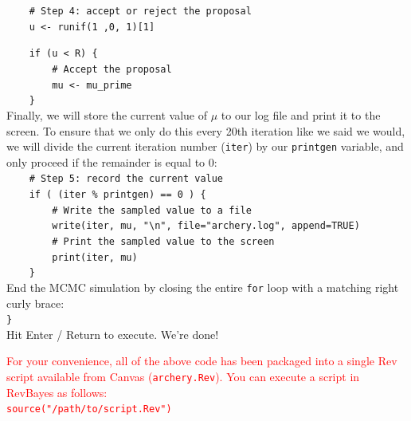 \documentclass[12pt]{article}
\begin{document}
\indent \texttt{\ \ \ \ \# Step 4: accept or reject the proposal} \\
\indent \texttt{\ \ \ \ u <- runif(1 ,0, 1)[1] } \\

\newpage

\indent \texttt{\ \ \ \ if (u < R) \{} \\
\indent \texttt{\ \ \ \ \ \ \ \ \# Accept the proposal} \\
\indent \texttt{\ \ \ \ \ \ \ \ mu <- mu\_prime} \\ 
\indent \texttt{\ \ \ \ \}} \\

\noindent Finally, we will store the current value of $\mu$ to our log file and print it to the screen. To ensure that we only do this every 20th iteration like we said we would, we will divide the current iteration number (\texttt{iter}) by our \texttt{printgen} variable, and only proceed if the remainder is equal to 0: \\

\indent \texttt{\ \ \ \ \# Step 5: record the current value} \\
\indent \texttt{\ \ \ \ if ( (iter \% printgen) == 0 ) \{} \\
\indent \texttt{\ \ \ \ \ \ \ \ \# Write the sampled value to a file} \\
\indent \texttt{\ \ \ \ \ \ \ \ write(iter, mu, "\textbackslash n", file="archery.log", append=TRUE)} \\
\indent \texttt{\ \ \ \ \ \ \ \ \# Print the sampled value to the screen} \\
\indent \texttt{\ \ \ \ \ \ \ \ print(iter, mu)} \\
\indent \texttt{\ \ \ \ \}} \\

\noindent End the MCMC simulation by closing the entire \texttt{for} loop with a matching right curly brace: \\

\indent \texttt{\}} \\

\noindent Hit Enter / Return to execute. We're done!

\vspace*{1ex}

\begin{center}
\textcolor{red}{For your convenience, all of the above code has been packaged into a single Rev script available from Canvas (\texttt{archery.Rev}). You can execute a script in RevBayes as follows:} \\
\textcolor{red}{\texttt{source("/path/to/script.Rev")}}
\end{center}
\end{document}
